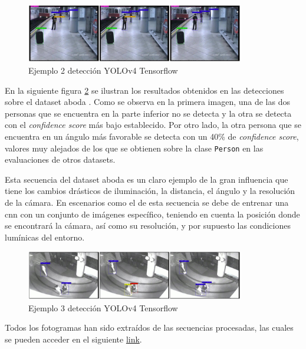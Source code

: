 \begin{figure}[ht]
\centering
\includegraphics[width=0.85\textwidth]{img/chapters/resultados/deteccion/avss-easy-detection-example.jpg}
\caption{\label{fig:avss-easy-detection-example}Ejemplo 2 detección YOLOv4 Tensorflow \cite{AVSSAB2007-dataset}}
\end{figure}

En la siguiente figura \ref{fig:aboda-video5-detection-example} se ilustran los resultados obtenidos en las detecciones sobre el dataset \gls{aboda} \cite{aboda-dataset}. Como se observa en la primera imagen, una de las dos personas que se encuentra en la parte inferior no se detecta y la otra se detecta con el \textit{confidence score} más bajo establecido. Por otro lado, la otra persona que se encuentra en un ángulo más favorable se detecta con un 40\% de \textit{confidence score}, valores muy alejados de los que se obtienen sobre la clase \texttt{Person} en las evaluaciones de otros datasets.

Esta secuencia del dataset \gls{aboda} es un claro ejemplo de la gran influencia que tiene los cambios drásticos de iluminación, la distancia, el ángulo y la resolución de la cámara. En escenarios como el de esta secuencia se debe de entrenar una \gls{cnn} con un conjunto de imágenes específico, teniendo en cuenta la posición donde se encontrará la cámara, así como su resolución, y por supuesto las condiciones lumínicas del entorno.

\begin{figure}[ht]
\centering
\includegraphics[width=0.85\textwidth]{img/chapters/resultados/deteccion/aboda-video5-detection-example.jpg}
\caption{\label{fig:aboda-video5-detection-example}Ejemplo 3 detección YOLOv4 Tensorflow \cite{aboda-dataset}}
\end{figure}

Todos los fotogramas han sido extraídos de las secuencias procesadas, las cuales se pueden acceder en el siguiente \href{https://drive.google.com/drive/folders/1hkUSC78H5moLyTqoNy0e0RhQTJSPt_um?usp=sharing}{link}.

